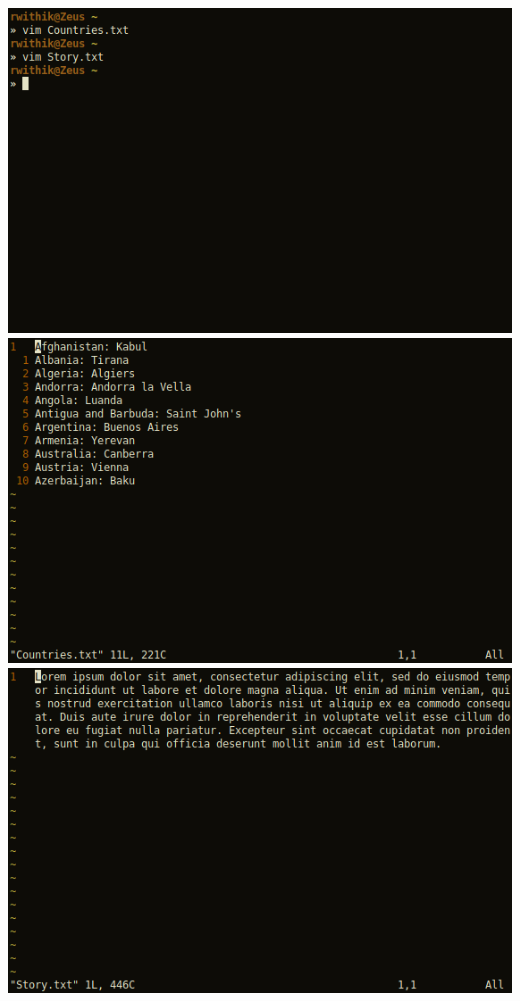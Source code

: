 \documentclass[10pt,a4paper,titlepage]{report}
\begin{document}
\includegraphics[scale=.5]{../Images/Cycle2/19A.png}\newline
\includegraphics[scale=.5]{../Images/Cycle2/19B.png}\newline
\includegraphics[scale=.5]{../Images/Cycle2/19C.png}\newline
\end{document}
